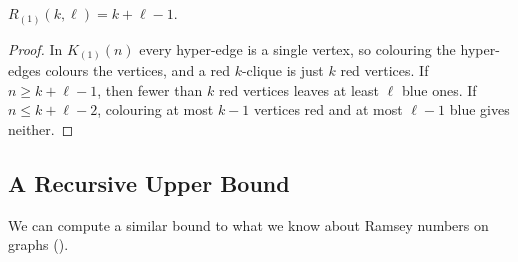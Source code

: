 \begin{boxlemma} \label{Ch6:Lemma:Hypergraph_Ramsey_1}
    $R_{(1)}(k, \ell) = k + \ell - 1$.
\end{boxlemma}
\begin{proof}
    In $K_{(1)}(n)$ every hyper-edge is a single vertex, so colouring the hyper-edges colours the vertices, and a red $k$-clique is just $k$ red vertices. If $n \geq k + \ell - 1$, then fewer than $k$ red vertices leaves at least $\ell$ blue ones. If $n \leq k + \ell - 2$, colouring at most $k - 1$ vertices red and at most $\ell - 1$ blue gives neither.
\end{proof}

\subsection{A Recursive Upper Bound}

We can compute a similar bound to what we know about Ramsey numbers on graphs ().

